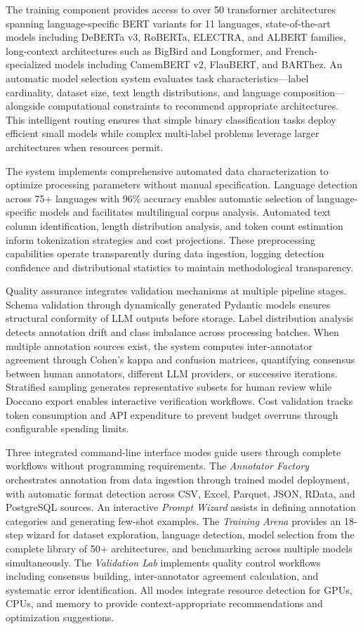\documentclass[12pt]{article}
\begin{document}
The training component provides access to over 50 transformer architectures spanning language-specific BERT variants for 11 languages, state-of-the-art models including DeBERTa v3, RoBERTa, ELECTRA, and ALBERT families, long-context architectures such as BigBird and Longformer, and French-specialized models including CamemBERT v2, FlauBERT, and BARThez. An automatic model selection system evaluates task characteristics—label cardinality, dataset size, text length distributions, and language composition—alongside computational constraints to recommend appropriate architectures. This intelligent routing ensures that simple binary classification tasks deploy efficient small models while complex multi-label problems leverage larger architectures when resources permit.

The system implements comprehensive automated data characterization to optimize processing parameters without manual specification. Language detection across 75+ languages with 96\% accuracy enables automatic selection of language-specific models and facilitates multilingual corpus analysis. Automated text column identification, length distribution analysis, and token count estimation inform tokenization strategies and cost projections. These preprocessing capabilities operate transparently during data ingestion, logging detection confidence and distributional statistics to maintain methodological transparency.

Quality assurance integrates validation mechanisms at multiple pipeline stages. Schema validation through dynamically generated Pydantic models ensures structural conformity of LLM outputs before storage. Label distribution analysis detects annotation drift and class imbalance across processing batches. When multiple annotation sources exist, the system computes inter-annotator agreement through Cohen's kappa and confusion matrices, quantifying consensus between human annotators, different LLM providers, or successive iterations. Stratified sampling generates representative subsets for human review while Doccano export enables interactive verification workflows. Cost validation tracks token consumption and API expenditure to prevent budget overruns through configurable spending limits.

Three integrated command-line interface modes guide users through complete workflows without programming requirements. The \emph{Annotator Factory} orchestrates annotation from data ingestion through trained model deployment, with automatic format detection across CSV, Excel, Parquet, JSON, RData, and PostgreSQL sources. An interactive \emph{Prompt Wizard} assists in defining annotation categories and generating few-shot examples. The \emph{Training Arena} provides an 18-step wizard for dataset exploration, language detection, model selection from the complete library of 50+ architectures, and benchmarking across multiple models simultaneously. The \emph{Validation Lab} implements quality control workflows including consensus building, inter-annotator agreement calculation, and systematic error identification. All modes integrate resource detection for GPUs, CPUs, and memory to provide context-appropriate recommendations and optimization suggestions.
\end{document}
